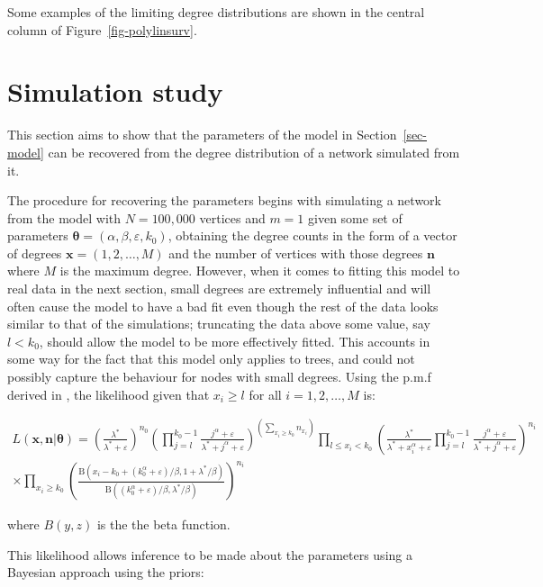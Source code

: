 \documentclass[
  sn-basic,
]{sn-jnl}
\theoremstyle{plain}
\theoremstyle{remark}
\begin{document}
Some examples of the limiting degree distributions are shown in the
central column of Figure~\ref{fig-polylinsurv}.

\section{Simulation study}\label{sec-rec}

This section aims to show that the parameters of the model in
Section~\ref{sec-model} can be recovered from the degree distribution of
a network simulated from it.

The procedure for recovering the parameters begins with simulating a
network from the model with \(N=100,000\) vertices and \(m=1\) given
some set of parameters
\(\pmb\theta = (\alpha, \beta, \varepsilon, k_0)\), obtaining the degree
counts in the form of a vector of degrees \(\pmb x = (1,2,\ldots,M)\)
and the number of vertices with those degrees \(\pmb n\) where \(M\) is
the maximum degree. However, when it comes to fitting this model to real
data in the next section, small degrees are extremely influential and
will often cause the model to have a bad fit even though the rest of the
data looks similar to that of the simulations; truncating the data above
some value, say \(l<k_0\), should allow the model to be more effectively
fitted. This accounts in some way for the fact that this model only
applies to trees, and could not possibly capture the behaviour for nodes
with small degrees. Using the p.m.f derived in \citet{rudas07}, the
likelihood given that \(x_i \ge l\) for all \(i =1,2,\ldots,M\) is:

\begin{align*}
L(\pmb x,\pmb n | \pmb \theta) = \left(\frac{\lambda^*}{\lambda^*+\varepsilon}\right)^{n_0}\left(\prod_{j=l}^{k_0-1}\frac{j^\alpha +\varepsilon}{\lambda^* + j^\alpha +\varepsilon}\right)^{\left(\sum_{x_i\ge k_0}n_{x_i}\right)} \prod_{l \le x_i<k_0}\left(\frac{\lambda^*}{\lambda^* +x_i^\alpha + \varepsilon } \prod_{j=l}^{k_0-1}\frac{j^\alpha + \varepsilon}{\lambda^* + j^\alpha + \varepsilon}\right)^{n_i}\\ \times \prod_{x_i\ge k_0}\left(\frac{\text{B}(x_i-k_0 + (k_0^\alpha + \varepsilon)/\beta,1+\lambda^*/\beta)}{\text{B}((k_0^\alpha + \varepsilon)/\beta,\lambda^*/\beta)}\right)^{n_i}
\end{align*}

where \(B(y,z)\) is the the beta function.

This likelihood allows inference to be made about the parameters using a
Bayesian approach using the priors:
\end{document}
